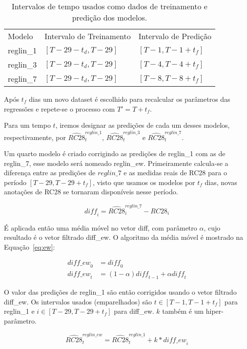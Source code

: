 \begin{table}[]
  \centering 
  \begin{tabular}{lll}
    Modelo    & Intervalo de Treinamento & Intervalo de Predição \\
    reglin\_1 & $[T-29-t_d,T-29]$        & $[T-1, T-1+t_f]$      \\
    reglin\_3 &  $[T-29-t_d,T-29]$       &  $[T-4, T-4+t_f]$      \\
    reglin\_7 &   $[T-29-t_d,T-29]$      &   $[T-8, T-8+t_f]$       
  \end{tabular}
  \caption{Intervalos de tempo usados como dados de treinamento e predição dos modelos.}
  \label{tab:ranges}
\end{table}


Após $t_f$ dias um novo dataset é escolhido para recalcular os parâmetros das regressões e repete-se o processo com $T' = T + t_f$.


Para um tempo $t$, iremos designar as predições de cada um desses modelos,
respectivamente, por $\hat{RC28}^{reglin\_1}_t$, $\hat{RC28}^{reglin\_3}_t$ e $\hat{RC28}^{reglin\_7}_t$.

Um quarto modelo é criado corrigindo as predições de reglin\_1 com as de
reglin\_7, esse modelo será nomeado reglin\_ew. Primeiramente calcula-se a
diferença entre as predições de $reglin\_7$ e as medidas reais de RC28 para o período
$[T-29,T-29 + t_f]$, visto que usamos os modelos por $t_f$ dias, novas
anotações de RC28 se tornaram disponíveis nesse período. 


\[
  \mathit{diff}_i = \hat{RC28}^{reglin\_7}_i - RC28_i
\]

É aplicada então uma média móvel no vetor diff, com parâmetro
$\alpha$, cujo resultado é o vetor filtrado diff\_ew. O algoritmo da média móvel
é mostrado na Equação~\ref{eq:ew}:


  \begin{align}
    \mathit{diff\_ew}_0 &= \mathit{diff}_0 \\
  \mathit{diff\_ew}_t &= (1- \alpha)\mathit{diff}_{t-1} + \alpha \mathit{diff}_t 
  \label{eq:ew}
  \end{align}


O valor das predições de reglin\_1 são então corrigidos usando o vetor filtrado
diff\_ew. Os intervalos usados (emparelhados) são $t \in [T-1,T-1+t_f]$ para
reglin\_1 e $i \in [T-29,T-29+t_f]$ para diff\_ew. $k$ também é um hiper-parâmetro.

\[
     \hat{RC28}_t^{reglin\_ew} = \hat{RC28}^{reglin\_1}_t + k * \mathit{diff\_ew}_i
\]


